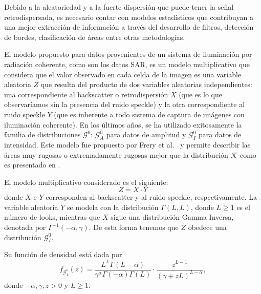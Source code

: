 \documentclass[11pt]{article}
\begin{document}
Debido a la aleatoriedad y a la fuerte dispersión que puede tener la señal retrodispersada, es necesario contar con modelos estadísticos que contribuyan a una mejor extracción de información a través del desarrollo de filtros, detección de bordes, clasificación de áreas entre otras metodologías. 


El modelo propuesto para datos provenientes de un sistema de iluminación por radiación coherente, como son los datos SAR, es un modelo multiplicativo que considera que el valor observado en cada celda de la imagen es una variable aleatoria $Z$ que resulta del producto de dos variables aleatorias independientes: una correspondiente al backscatter o retrodispersión $X$ (que es lo que observaríamos sin la presencia del ruido speckle) y la otra correspondiente al ruido speckle $Y$ (que es inherente a todo sistema de captura de imágenes con iluminación coherente). En los últimos años, se ha utilizado exitosamente la familia de distribuciones $\mathcal{G}^0$: $\mathcal{G}_A^0$ para datos de amplitud y $\mathcal G_I^0$ para datos de intensidad. Este modelo fue propuesto por Frery et al.~\cite{Frery97} y permite describir las áreas muy rugosas o extremadamente rugosas mejor que la distribución $\mathcal{K}$ como es presentado en \cite{Jakeman87}.

El modelo multiplicativo considerado es el siguiente:
\begin{equation*}
Z=X \cdot Y  
\end{equation*}
donde $X$ e $Y$ corresponden al backscatter y al ruido speckle, respectivamente. La variable aleatoria $Y$ se modela con la distribución $\Gamma ( L,L) $, donde $L\geq 1$ es el número de looks, mientras que $X$ sigue una distribución Gamma Inversa, denotada por  $\Gamma^{-1}(-\alpha ,\gamma) $. De esta forma tenemos que $Z$ obedece una distribución $\mathcal G_I^0$.

Su función de densidad está dada por
\begin{equation*}
f_{\mathcal{G}_I^{0}}( z) =\frac{L^{L}\Gamma ( L-\alpha
	) }{\gamma ^{\alpha }\Gamma ( -\alpha ) \Gamma (
	L) }\cdot  
\frac{z^{L-1}}{( \gamma +zL) ^{L-\alpha }},%
\label{ec_dens_gI0}
\end{equation*}
donde $-\alpha,\gamma ,z>0$ y $L\geq 1$.
\end{document}
